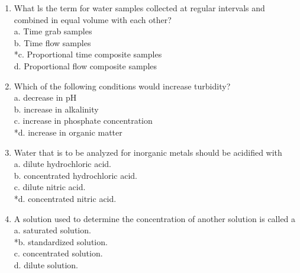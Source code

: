 \begin{enumerate}[1.]
\item 	What ls the term for water samples collected at regular intervals and combined in equal volume with each other?\\
a.  Time grab samples\\
b.  Time flow samples\\
*c. Proportional time composite samples\\
d. Proportional flow composite samples\\

\item Which of the following conditions would increase turbidity?\\
a.	decrease in pH\\
b.	increase in alkalinity\\
c.	 increase in phosphate concentration\\
*d.	increase in organic matter\\

 \item Water that is to be analyzed for inorganic metals should be acidified with\\
a. dilute hydrochloric acid.\\
b. concentrated hydrochloric acid.\\
c. dilute nitric acid.\\
*d. concentrated nitric acid. 

\item A solution used to determine the concentration of another solution is called a\\

a. saturated solution.\\
*b. standardized solution.\\
c. concentrated solution.\\
d. dilute solution.\\


\end{enumerate}
